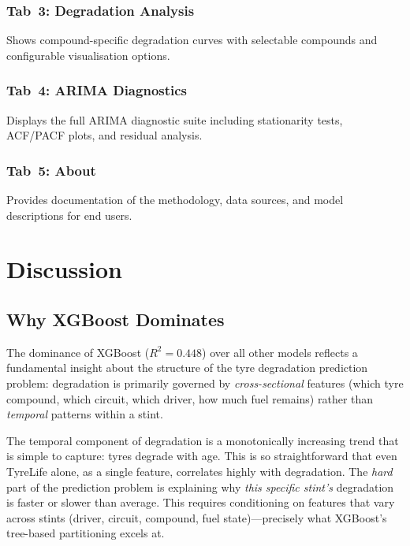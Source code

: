 \documentclass[journal,twoside]{IEEEtran}
\begin{document}
\subsubsection{Tab~3: Degradation Analysis}

Shows compound-specific degradation curves with selectable compounds
and configurable visualisation options.

\subsubsection{Tab~4: ARIMA Diagnostics}

Displays the full ARIMA diagnostic suite including stationarity tests,
ACF/PACF plots, and residual analysis.

\subsubsection{Tab~5: About}

Provides documentation of the methodology, data sources, and model
descriptions for end users.

\section{Discussion}\label{sec:discussion}

\subsection{Why XGBoost Dominates}

The dominance of XGBoost ($R^{2}=0.448$) over all other models reflects
a fundamental insight about the structure of the tyre degradation
prediction problem: degradation is primarily governed by
\emph{cross-sectional} features (which tyre compound, which circuit,
which driver, how much fuel remains) rather than \emph{temporal}
patterns within a stint.

The temporal component of degradation is a monotonically increasing
trend that is simple to capture: tyres degrade with age.  This is so
straightforward that even TyreLife alone, as a single feature,
correlates highly with degradation.  The \emph{hard} part of the
prediction problem is explaining why \emph{this specific stint's}
degradation is faster or slower than average.  This requires
conditioning on features that vary across stints (driver, circuit,
compound, fuel state)---precisely what XGBoost's tree-based partitioning
excels at.
\end{document}
